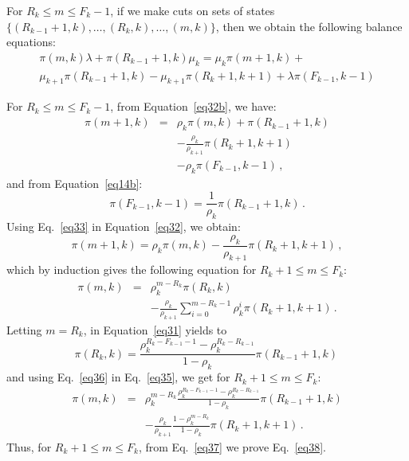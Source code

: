 \documentclass[conference]{IEEEtran}
\begin{document}
\begin{IEEEproof}
For $R_k \leq m \leq F_k-1$, if we make cuts on sets of states
$\{(R_{k-1}+1,k),\ldots,(R_{k},k),\ldots, (m,k)\}$,
then we obtain the following balance equations:
\begin{multline}
 \pi(m,k)\lambda +   \pi(R_{k-1}+1,k) \mu_k = \mu_k \pi(m+1,k) + \\
 \mu_{k+1} \pi(R_{k-1}+1,k) - \mu_{k+1} \pi(R_{k}+1, k+1) +  \lambda \pi(F_{k-1}, k-1)
\label{eq32b}
\end{multline}

For $R_{k} \leq m \leq F_k-1$, from Equation~\eqref{eq32b}, we have:
\begin{eqnarray}
\pi(m+1,k)  &=& \rho_k \pi(m,k) +  \pi(R_{k-1}+1,k) \nonumber\\
&&- \frac{\rho_k}{\rho_{k+1}} \pi(R_{k}+1, k+1) \nonumber \\
&&- \rho_k \pi(F_{k-1}, k-1) \, ,
\label{eq32}
\end{eqnarray}
and from Equation~\eqref{eq14b}:
\begin{equation}
\pi(F_{k-1},k-1)= \frac{1}{\rho_k} \pi(R_{k-1}+1,k) \, .
\label{eq33}
\end{equation}
Using Eq.~\eqref{eq33} in Equation~\eqref{eq32}, we obtain:
\begin{equation}
\pi(m+1,k)  = \rho_k \pi(m,k)    - \frac{\rho_k}{\rho_{k+1}} \pi(R_{k}+1, k+1) \, ,
\label{eq34}
\end{equation}
which by induction gives the following equation for $R_k+1 \leq m \leq F_k$:
\begin{eqnarray}
\pi(m,k)  &=& \rho_k^{m-R_k} \pi(R_k,k)  \nonumber  \\
&&- \frac{\rho_k}{\rho_{k+1}} \sum_{i=0}^{m-R_k-1} \rho_k^i \pi(R_{k}+1, k+1) \, .
\label{eq35}
\end{eqnarray}
Letting $m=R_k$, in Equation~\eqref{eq31} yields to
\begin{equation}
\pi(R_k,k)= \frac{ \rho_k^{R_k-F_{k-1}-1}-\rho_k^{R_k-R_{k-1}} } {1-\rho_k} \pi(R_{k-1}+1,k) \,
\label{eq36}
\end{equation}
and using Eq.~\eqref{eq36} in Eq.~\eqref{eq35}, we get for $R_k+\!1 \! \leq m \leq \! F_k$:
\begin{eqnarray}
\pi(m,k)\! & \! = \! & \rho_k^{m-R_k} \frac{ \rho_k^{R_k-F_{k-1}-1}-\rho_k^{R_k-R_{k-1}} } {1-\rho_k} \pi(R_{k-1} \! +\!1,k) \nonumber\\
&&- \frac{\rho_k}{\rho_{k+1}} \frac{1- \rho_k ^{m-R_k}} {1-\rho_k} \pi(R_{k}+1, k+1) \, .
 \label{eq37}
\end{eqnarray}
Thus, for $R_k+1 \! \leq \! m \! \leq \! F_k$, from Eq.~\eqref{eq37} we prove Eq.~\eqref{eq38}.
\end{IEEEproof}
\end{document}
